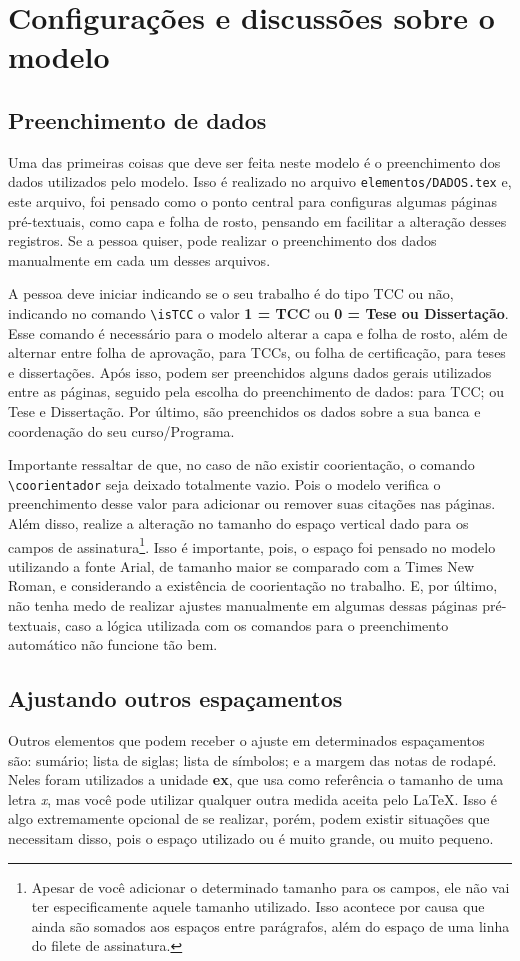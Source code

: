 \chapter{Configurações e discussões sobre o modelo}\label{capitulo:configuracao}
\section{Preenchimento de dados}
Uma das primeiras coisas que deve ser feita neste modelo é o preenchimento dos dados utilizados pelo modelo. Isso é realizado no arquivo \texttt{elementos/DADOS.tex} e, este arquivo, foi pensado como o ponto central para configuras algumas páginas pré-textuais, como capa e folha de rosto, pensando em facilitar a alteração desses registros. Se a pessoa quiser, pode realizar o preenchimento dos dados manualmente em cada um desses arquivos.

A pessoa deve iniciar indicando se o seu trabalho é do tipo TCC ou não, indicando no comando \verb|\isTCC| o valor \textbf{1 = TCC} ou \textbf{0 = Tese ou Dissertação}. Esse comando é necessário para o modelo alterar a capa e folha de rosto, além de alternar entre folha de aprovação, para TCCs, ou folha de certificação, para teses e dissertações. Após isso, podem ser preenchidos alguns dados gerais utilizados entre as páginas, seguido pela escolha do preenchimento de dados: para TCC; ou Tese e Dissertação. Por último, são preenchidos os dados sobre a sua banca e coordenação do seu curso/Programa.

Importante ressaltar de que, no caso de não existir coorientação, o comando \verb|\coorientador| seja deixado totalmente vazio. Pois o modelo verifica o preenchimento desse valor para adicionar ou remover suas citações nas páginas. Além disso, realize a alteração no tamanho do espaço vertical dado para os campos de assinatura\footnote{Apesar de você adicionar o determinado tamanho para os campos, ele não vai ter especificamente aquele tamanho utilizado. Isso acontece por causa que ainda são somados aos espaços entre parágrafos, além do espaço de uma linha do filete de assinatura.}. Isso é importante, pois, o espaço foi pensado no modelo utilizando a fonte Arial, de tamanho maior se comparado com a Times New Roman, e considerando a existência de coorientação no trabalho. E, por último, não tenha medo de realizar ajustes manualmente em algumas dessas páginas pré-textuais, caso a lógica utilizada com os comandos para o preenchimento automático não funcione tão bem.

\section{Ajustando outros espaçamentos}
Outros elementos que podem receber o ajuste em determinados espaçamentos são: sumário; lista de siglas; lista de símbolos; e a margem das notas de rodapé. Neles foram utilizados a unidade \textbf{ex}, que usa como referência o tamanho de uma letra \textit{x}, mas você pode utilizar qualquer outra medida aceita pelo \LaTeX{}. Isso é algo extremamente opcional de se realizar, porém, podem existir situações que necessitam disso, pois o espaço utilizado ou é muito grande, ou muito pequeno.

